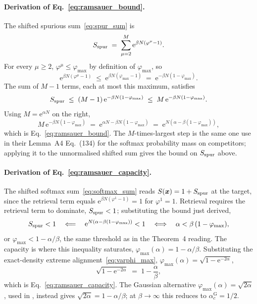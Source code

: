 \documentclass[letterpaper]{article} %
\newcommand{\e}{{\mathrm{e}}}
\newcommand{\Bnet}{\beta}
\newcommand{\acGauss}{\alpha_c^{\mathrm{G}}}
\begin{document}
\paragraph{Derivation of Eq.~\eqref{eq:ramsauer_bound}.}
The shifted spurious sum~\eqref{eq:spur_sum} is
\begin{equation*}
S_{\rm spur} \;=\; \sum_{\mu = 2}^M \e^{\Bnet N (\varphi^\mu - 1)}.
\end{equation*}
For every $\mu \geq 2$, $\varphi^\mu \leq \varphi_{\max}$ by
definition of $\varphi_{\max}$, so
\begin{equation*}
\e^{\Bnet N (\varphi^\mu - 1)} \;\leq\; \e^{\Bnet N (\varphi_{\max} - 1)}
   \;=\; \e^{-\Bnet N (1-\varphi_{\max})}.
\end{equation*}
The sum of $M - 1$ terms, each at most this maximum, satisfies
\begin{equation*}
S_{\rm spur} \;\leq\; (M-1)\,\e^{-\Bnet N (1-\varphi_{\max})}
   \;\leq\; M\,\e^{-\Bnet N (1-\varphi_{\max})}.
\end{equation*}
Using $M = \e^{\alpha N}$ on the right,
\begin{equation*}
M\,\e^{-\Bnet N (1-\varphi_{\max})}
   \;=\; \e^{\alpha N - \Bnet N (1-\varphi_{\max})}
   \;=\; \e^{N(\alpha - \Bnet(1-\varphi_{\max}))},
\end{equation*}
which is Eq.~\eqref{eq:ramsauer_bound}.  The $M$-times-largest step
is the same one \citeauthor{ramsauer2021hopfield} use in their
Lemma~A4 Eq.~(134) for the softmax probability mass on competitors;
applying it to the unnormalised shifted sum gives the bound on
$S_{\rm spur}$ above.

\paragraph{Derivation of Eq.~\eqref{eq:ramsauer_capacity}.}
The shifted softmax sum~\eqref{eq:softmax_sum} reads
$S(\bm x) = 1 + S_{\rm spur}$ at the target, since the retrieval
term equals $\e^{\Bnet N(\varphi^1 - 1)} = 1$ for $\varphi^1 = 1$.
Retrieval requires the retrieval term to dominate, $S_{\rm spur} < 1$;
substituting the bound just derived,
\begin{equation*}
S_{\rm spur} < 1 \quad\Longleftarrow\quad
\e^{N(\alpha - \Bnet(1-\varphi_{\max}))} < 1
\quad\Longleftrightarrow\quad
\alpha < \Bnet\,(1-\varphi_{\max}),
\end{equation*}
or $\varphi_{\max} < 1 - \alpha/\Bnet$, the same threshold as in the
Theorem~4 reading.  The capacity is where this inequality saturates,
$\varphi_{\max}(\alpha) = 1 - \alpha/\Bnet$.  Substituting the
exact-density extreme alignment~\eqref{eq:varphi_max},
$\varphi_{\max}(\alpha) = \sqrt{1 - \e^{-2\alpha}}$,
\begin{equation*}
\sqrt{1 - \e^{-2\alpha}} \;=\; 1 - \frac{\alpha}{\Bnet},
\end{equation*}
which is Eq.~\eqref{eq:ramsauer_capacity}.  The Gaussian alternative
$\varphi_{\max}(\alpha) = \sqrt{2\alpha}$, used in
\citet{icml2026theory}, instead gives
$\sqrt{2\alpha} = 1 - \alpha/\Bnet$; at $\Bnet \to \infty$ this
reduces to $\acGauss = 1/2$.
\end{document}
